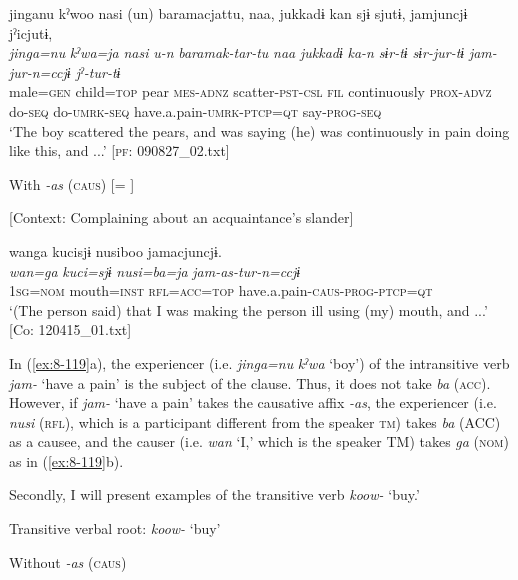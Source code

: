   {\TM}
\glll  jinganu  kˀwoo  nasi  (un)  baramacjattu,  naa,   jukkadɨ  kan  sjɨ  sjutɨ,    jamjuncjɨ  jˀicjutɨ,\\
\textit{jinga=nu}  \textit{kˀwa=ja}  \textit{nasi}  \textit{u-n}  \textit{baramak-tar-tu}  \textit{naa}    \textit{jukkadɨ}  \textit{ka-n}  \textit{sɨr-tɨ}  \textit{sɨr-jur-tɨ}    \textit{jam-jur-n=ccjɨ  jˀ-tur-tɨ}
\\
    male=\textsc{gen}  child=\textsc{top}  pear  \textsc{mes}-\textsc{adnz}  scatter-\textsc{pst}-\textsc{csl}  \textsc{fil}   continuously  \textsc{prox}-\textsc{advz}  do-\textsc{seq}  do-\textsc{umrk}-\textsc{seq}  have.a.pain-\textsc{umrk}-\textsc{ptcp}=\textsc{qt}  say-\textsc{prog}-\textsc{seq}\\
\glt ‘The boy scattered the pears, and was saying (he) was continuously in pain doing like this, and ...’ [\textsc{pf}: 090827\_02.txt]


\ex With \textit{-as} (\textsc{caus}) [= ]

  [Context: Complaining about an acquaintance’s slander]

  {\TM}
\glll  wanga  kucisjɨ  nusiboo  jamacjuncjɨ.\\
\textit{wan=ga}  \textit{kuci=sjɨ}  \textit{nusi=ba=ja}  \textit{jam-as-tur-n=ccjɨ}\\
    1\textsc{sg}=\textsc{nom}  mouth=\textsc{inst}  \textsc{rfl}=\textsc{acc}=\textsc{top}  have.a.pain-\textsc{caus}-\textsc{prog}-\textsc{ptcp}=\textsc{qt}\\
\glt ‘(The person\textit{\textsubscript{}} said) that I was making the person ill using (my) mouth, and ...’ [Co: 120415\_01.txt]
\z
\z

In (\ref{ex:8-119}a), the experiencer (i.e. \textit{jinga=nu} \textit{kˀwa} ‘boy’) of the intransitive verb \textit{jam-} ‘have a pain’ is the subject of the clause. Thus, it does not take \textit{ba} (\textsc{acc}). However, if \textit{jam-} ‘have a pain’ takes the causative affix \textit{-as}, the experiencer (i.e. \textit{nusi} (\textsc{rfl}), which is a participant different from the speaker \textsc{tm}) takes \textit{ba} (ACC) as a causee, and the causer (i.e. \textit{wan} ‘I,’ which is the speaker TM) takes \textit{ga} (\textsc{nom}) as in (\ref{ex:8-119}b).

  Secondly, I will present examples of the transitive verb \textit{koow-} ‘buy.’

\ea\label{ex:8-120}
  Transitive verbal root: \textit{koow-} ‘buy’

\ea Without \textit{-as} (\textsc{caus})

